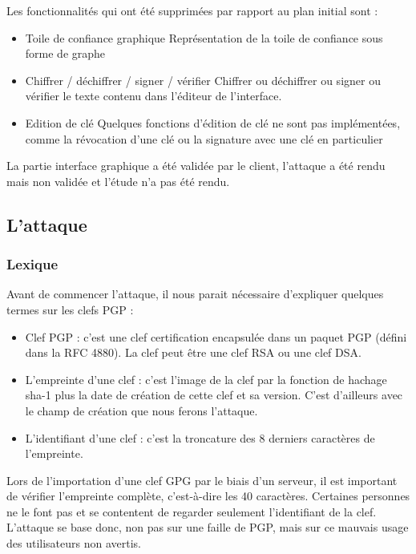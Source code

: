 \documentclass{../res/univ-projet}
\begin{document}
   Les fonctionnalités qui ont été supprimées par rapport au plan initial sont :\medbreak
  \begin{itemize}
  \item Toile de confiance graphique\smallbreak
  Représentation de la toile de confiance sous forme de graphe\smallbreak
  \item Chiffrer / déchiffrer / signer / vérifier \smallbreak
  Chiffrer ou déchiffrer ou signer ou vérifier le texte contenu dans l'éditeur de l'interface.\smallbreak
  \item Edition de clé \smallbreak
  Quelques fonctions d'édition de clé ne sont pas implémentées, comme la révocation d'une clé ou la signature avec une clé en particulier \smallbreak 
  
  \end{itemize}

  La partie interface graphique a été validée par le client, l'attaque a été rendu mais non validée et l'étude n'a pas été rendu.
 
 \subsection{L'attaque}
  
  \subsubsection{Lexique}
  
  Avant de commencer l'attaque, il nous parait nécessaire d'expliquer quelques termes sur les clefs PGP :
  
  \begin{itemize}
  	\item Clef PGP : c'est une clef certification encapsulée dans un paquet PGP (défini dans la RFC 4880). La clef peut être une clef RSA ou une clef DSA.
	\item L'empreinte d'une clef : c'est l'image de la clef par la fonction de hachage sha-1 plus la date de création de cette clef et sa version. C'est d'ailleurs avec le champ de création que nous ferons l'attaque.
	\item L'identifiant d'une clef : c'est la troncature des 8 derniers caractères de l'empreinte.
  \end{itemize}
  
  
  Lors de l'importation d'une clef GPG par le biais d'un serveur, il est important de vérifier l'empreinte complète, c'est-à-dire les 40 caractères. Certaines personnes ne le font pas et se contentent de regarder seulement l'identifiant de la clef. L'attaque se base donc, non pas sur une faille de PGP, mais sur ce mauvais usage des utilisateurs non avertis. 
  
\end{document}
